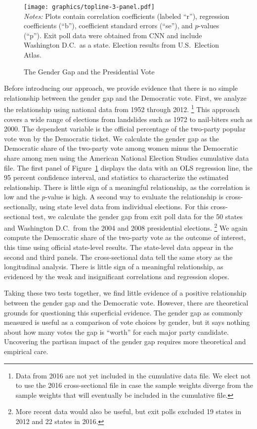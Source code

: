 \documentclass[12pt
               ,final
               ]{article}
\newcommand{\notes}[1]{\\
\small
\emph{Notes:} #1}
\begin{document}
\begin{figure}[hbt]
  \centering
  \caption{The Gender Gap and the Presidential Vote}
  \texttt{[image: graphics/topline-3-panel.pdf]}
  \label{fig:topline}
  \notes{Plots contain correlation coefficients (labeled ``r''), regression coefficients (``b''), coefficient standard errors (``se''), and $p$-values (``p''). Exit poll data were obtained from CNN and include Washington D.C.\ as a state. Election results from U.S.\ Election Atlas.}
\end{figure}

Before introducing our approach, we provide evidence that there is no simple relationship between the gender gap and the Democratic vote.
First, we analyze the relationship using national data from 1952 through 2012.%
  \footnote{Data from 2016 are not yet included in the cumulative data file. We elect not to use the 2016 cross-sectional file in case the sample weights diverge from the sample weights that will eventually be included in the cumulative file.}
This approach covers a wide range of elections from landslides such as 1972 to nail-biters such as 2000. The dependent variable is the official percentage of the two-party popular vote won by the Democratic ticket. We calculate the gender gap as the Democratic share of the two-party vote among women minus the Democratic share among men using the American National Election Studies cumulative data file. The first panel of Figure~\ref{fig:topline} displays the data with an OLS regression line, the 95 percent confidence interval, and statistics to characterize the estimated relationship. There is little sign of a meaningful relationship, as the correlation is low and the $p$-value is high. A second way to evaluate the relationship is cross-sectionally, using state level data from individual elections. For this cross-sectional test, we calculate the gender gap from exit poll data for the 50 states and Washington D.C.\ from the 2004 and 2008 presidential elections.%
  \footnote{More recent data would also be useful, but exit polls excluded 19 states in 2012 and 22 states in 2016.} 
We again compute the Democratic share of the two-party vote as the outcome of interest, this time using official state-level results. The state-level data appear in the second and third panels. The cross-sectional data tell the same story as the longitudinal analysis. There is little sign of a meaningful relationship, as evidenced by the weak and insignificant correlations and regression slopes. 

Taking these two tests together, we find little evidence of a positive relationship between the gender gap and the Democratic vote. However, there are theoretical grounds for questioning this superficial evidence. The gender gap as commonly measured is useful as a comparison of vote choices by gender, but it says nothing about how many votes the gap is ``worth'' for each major party candidate. Uncovering the partisan impact of the gender gap requires more theoretical and empirical care.
\end{document}
